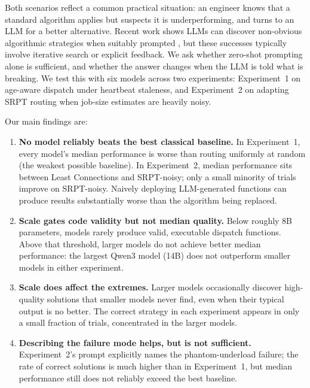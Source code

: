 \documentclass[11pt]{article}
\begin{document}
Both scenarios reflect a common practical situation: an engineer
knows that a standard algorithm applies but suspects it is
underperforming, and turns to an LLM for a better alternative.
Recent work shows LLMs can discover non-obvious algorithmic
strategies when suitably prompted
\citep{fawzi2024funsearch, novikov2025alphaevolve, ma2024eureka},
but these successes typically involve iterative search or explicit
feedback.
We ask whether zero-shot prompting alone is sufficient, and whether
the answer changes when the LLM is told what is breaking.
We test this with six models across two experiments: Experiment~1
on age-aware dispatch under heartbeat staleness, and Experiment~2
on adapting SRPT routing when job-size estimates are heavily noisy.

Our main findings are:
\begin{enumerate}
  \item \textbf{No model reliably beats the best classical baseline.}
    In Experiment~1, every model's median performance is worse than
    routing uniformly at random (the weakest possible baseline).
    In Experiment~2, median performance sits between Least Connections
    and SRPT-noisy; only a small minority of trials improve on
    SRPT-noisy.
    Naively deploying LLM-generated functions can produce results
    substantially worse than the algorithm being replaced.
  \item \textbf{Scale gates code validity but not median quality.}
    Below roughly 8B parameters, models rarely produce valid,
    executable dispatch functions.
    Above that threshold, larger models do not achieve better median
    performance: the largest Qwen3 model (14B) does not outperform
    smaller models in either experiment.
  \item \textbf{Scale does affect the extremes.}
    Larger models occasionally discover high-quality solutions that
    smaller models never find, even when their typical output is no
    better.
    The correct strategy in each experiment appears in only a small
    fraction of trials, concentrated in the larger models.
  \item \textbf{Describing the failure mode helps, but is not sufficient.}
    Experiment~2's prompt explicitly names the phantom-underload
    failure; the rate of correct solutions is much higher than in
    Experiment~1, but median performance still does not reliably
    exceed the best baseline.
\end{enumerate}

\end{document}
